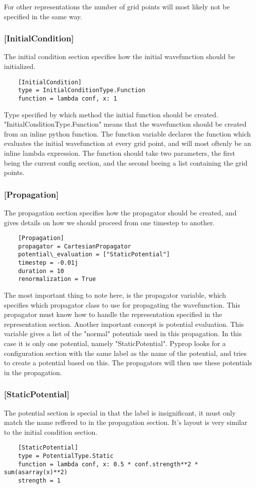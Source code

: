 \documentclass[a4paper,12pt]{report}
\begin{document}
For other representations the number of grid points will most likely not be specified in the same way.

\subsubsection*{[InitialCondition]}
The initial condition section specifies how the initial wavefunction should be initialized.
\begin{verbatim}
	[InitialCondition]
	type = InitialConditionType.Function
	function = lambda conf, x: 1
\end{verbatim}
Type specified by which method the initial function should be created. "InitialConditionType.Function" means that the
wavefunction should be created from an inline python function. The function variable declares the function which evaluates
the initial wavefunction at every grid point, and will most oftenly be an inline lambda expression. The function should take
two parameters, the first being the current config section, and the second beeing a list containing the grid points.

\subsubsection*{[Propagation]}
The propagation section specifies how the propagator should be created, and gives details on how we should
proceed from one timestep to another.
\begin{verbatim}
	[Propagation]
	propagator = CartesianPropagator
	potential\_evaluation = ["StaticPotential"]
	timestep = -0.01j
	duration = 10
	renormalization = True
\end{verbatim}
The most important thing to note here, is the propagator variable, which specifies which propagator class to use
for propagating the wavefunction. This propagator must know how to handle the representation specified in the
representation section. Another important concept is potential evaluation. This variable gives a list of the
"normal" potentials used in this propagation. In this case it is only one potential, namely "StaticPotential". 
Pyprop looks for a configuration section with the same label as the name of the potential, and tries to create
a potential based on this. The propagators will then use these potentials in the propagation.

\subsubsection*{[StaticPotential]}
The potential section is special in that the label is insignificant, it must only match the name reffered to in
the propagation section. It's layout is very similar to the initial condition section.
\begin{verbatim}
	[StaticPotential]
	type = PotentialType.Static
	function = lambda conf, x: 0.5 * conf.strength**2 * sum(asarray(x)**2) 
	strength = 1
\end{verbatim}
\end{document}
